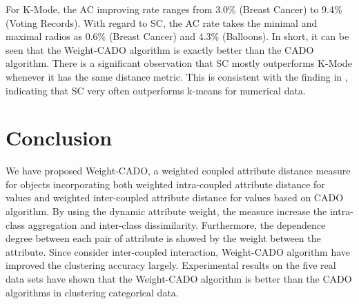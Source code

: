 \documentclass[review]{elsarticle}
\begin{document}
 For K-Mode, the AC improving rate ranges from 3.0\% (Breast Cancer) to 9.4\% (Voting Records). With regard to SC, the AC rate takes the minimal and maximal radios as 0.6\% (Breast Cancer) and 4.3\% (Balloons). In short, it can be seen that the Weight-CADO algorithm is exactly better than the CADO algorithm. There is a significant observation that SC mostly outperforms K-Mode whenever it has the same distance metric. This is consistent with the finding in \cite{UVon2007Tutorial}, indicating that SC very often outperforms k-means for numerical data.

\section{Conclusion}
We have proposed Weight-CADO, a weighted coupled attribute distance measure for objects incorporating both weighted intra-coupled attribute distance for values and weighted inter-coupled attribute distance for values based on CADO algorithm. By using the dynamic attribute weight, the measure increase the intra-class aggregation and inter-class dissimilarity. Furthermore, the dependence degree between each pair of attribute is showed by the weight between the attribute. Since consider inter-coupled interaction, Weight-CADO algorithm have improved the clustering accuracy largely. Experimental results on the five real data sets have shown that the Weight-CADO algorithm is better than the CADO algorithms in clustering categorical data.
\end{document}
